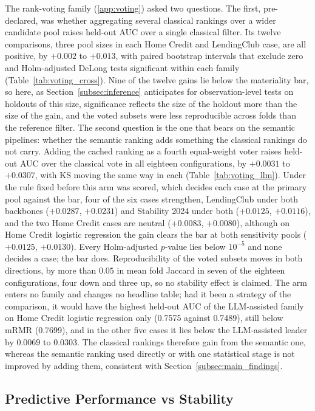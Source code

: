 \documentclass[final,5p,twocolumn]{elsarticle}
\begin{document}
The rank-voting family (\ref{app:voting}) asked two questions. The first, pre-declared, was whether aggregating several classical rankings over a wider candidate pool raises held-out AUC over a single classical filter. Its twelve comparisons, three pool sizes in each Home Credit and LendingClub case, are all positive, by $+0.002$ to $+0.013$, with paired bootstrap intervals that exclude zero and Holm-adjusted DeLong tests significant within each family (Table~\ref{tab:voting_cross}). Nine of the twelve gains lie below the materiality bar, so here, as Section~\ref{subsec:inference} anticipates for observation-level tests on holdouts of this size, significance reflects the size of the holdout more than the size of the gain, and the voted subsets were less reproducible across folds than the reference filter. The second question is the one that bears on the semantic pipelines: whether the semantic ranking adds something the classical rankings do not carry. Adding the cached ranking as a fourth equal-weight voter raises held-out AUC over the classical vote in all eighteen configurations, by $+0.0031$ to $+0.0307$, with KS moving the same way in each (Table~\ref{tab:voting_llm}). Under the rule fixed before this arm was scored, which decides each case at the primary pool against the bar, four of the six cases strengthen, LendingClub under both backbones ($+0.0287$, $+0.0231$) and Stability 2024 under both ($+0.0125$, $+0.0116$), and the two Home Credit cases are neutral ($+0.0083$, $+0.0080$), although on Home Credit logistic regression the gain clears the bar at both sensitivity pools ($+0.0125$, $+0.0130$). Every Holm-adjusted $p$-value lies below $10^{-5}$ and none decides a case; the bar does. Reproducibility of the voted subsets moves in both directions, by more than $0.05$ in mean fold Jaccard in seven of the eighteen configurations, four down and three up, so no stability effect is claimed. The arm enters no family and changes no headline table; had it been a strategy of the comparison, it would have the highest held-out AUC of the LLM-assisted family on Home Credit logistic regression only (0.7575 against 0.7489), still below mRMR (0.7699), and in the other five cases it lies below the LLM-assisted leader by $0.0069$ to $0.0303$. The classical rankings therefore gain from the semantic one, whereas the semantic ranking used directly or with one statistical stage is not improved by adding them, consistent with Section~\ref{subsec:main_findings}.

\subsection{Predictive Performance vs Stability}
\label{subsec:performance_vs_stability}
\end{document}
